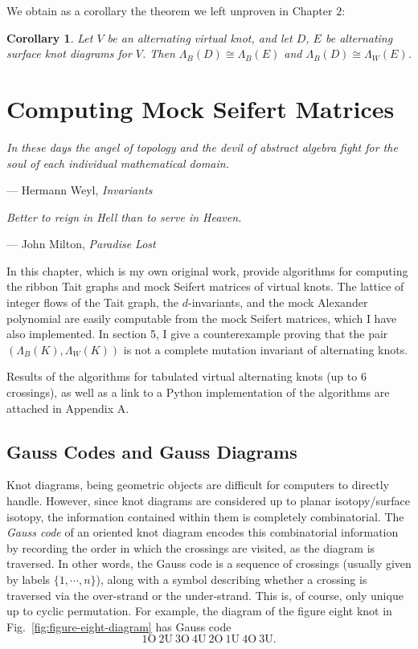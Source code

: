 \documentclass[12pt]{report}
\renewcommand{\over}{\text{O}}
\newcommand{\under}{\text{U}}
\newtheorem*{corollary}{Corollary}
\theoremstyle{upright}
\begin{document}
We obtain as a corollary the theorem we left unproven in Chapter $2$:

\begin{corollary}
Let $V$ be an alternating virtual knot, and let $D$, $E$ be alternating surface knot diagrams for $V$. Then $\Lambda_{B}(D) \cong \Lambda_{B}(E)$ and $\Lambda_{B}(D) \cong \Lambda_{W}(E)$.
\end{corollary}

\chapter{Computing Mock Seifert Matrices}

\epigraph{\itshape In these days the angel of topology and the devil of abstract algebra fight for the soul of each individual mathematical domain.}{--- Hermann Weyl, \textit{Invariants}}

\epigraph{\itshape Better to reign in Hell than to serve in Heaven.}{--- John Milton, \textit{Paradise Lost}}

In this chapter, which is my own original work,	provide algorithms for computing the ribbon Tait graphs and mock Seifert matrices of virtual knots. The lattice of integer flows of the Tait graph, the $d$-invariants, and the mock Alexander polynomial are easily computable from the mock Seifert matrices, which I have also implemented. In section 5, I give a counterexample proving that the pair $(\Lambda_{B}(K), \Lambda_{W}(K))$ is not a complete mutation invariant of alternating knots.

Results of the algorithms for tabulated virtual alternating knots (up to 6 crossings), as well as a link to a Python implementation of the algorithms are attached in Appendix A.

\section{Gauss Codes and Gauss Diagrams}

Knot diagrams, being geometric objects are difficult for computers to directly handle. However, since knot diagrams are considered up to planar isotopy/surface isotopy, the information contained within them is completely combinatorial. The \textit{Gauss code} of an oriented knot diagram encodes this combinatorial information by recording the order in which the crossings are visited, as the diagram is traversed. In other words, the Gauss code is a sequence of crossings (usually given by labels $\{1, \cdots, n\}$), along with a symbol describing whether a crossing is traversed via the over-strand or the under-strand. This is, of course, only unique up to cyclic permutation. For example, the diagram of the figure eight knot in Fig.~\ref{fig:figure-eight-diagram} has Gauss code
\[1\over\ 2\under\ 3\over\ 4\under\ 2\over\ 1\under\ 4\over\ 3\under.\]
\end{document}
